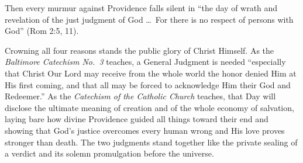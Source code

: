 Then every murmur against Providence falls silent in ``the day of wrath and revelation of the just judgment of God \dots\ For there is no respect of persons with God'' (Rom 2:5, 11).

Crowning all four reasons stands the public glory of Christ Himself. As the \textit{Baltimore Catechism No.\ 3} teaches, a General Judgment is needed ``especially that Christ Our Lord may receive from the whole world the honor denied Him at His first coming, and that all may be forced to acknowledge Him their God and Redeemer.'' As the \textit{Catechism of the Catholic Church} teaches, that Day will disclose the ultimate meaning of creation and of the whole economy of salvation, laying bare how divine Providence guided all things toward their end and showing that God's justice overcomes every human wrong and His love proves stronger than death. The two judgments stand together like the private sealing of a verdict and its solemn promulgation before the universe.
